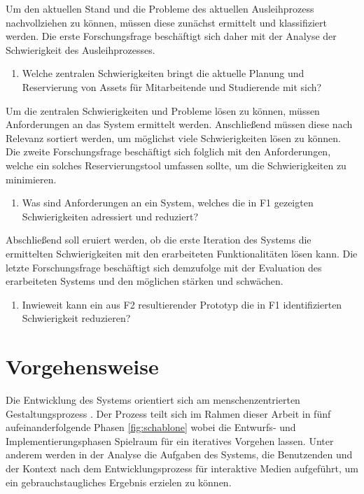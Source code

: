 Um den aktuellen Stand und die Probleme des aktuellen Ausleihprozess nachvollziehen zu können,
müssen diese zunächst ermittelt und klassifiziert werden. Die erste Forschungsfrage beschäftigt sich
daher mit der Analyse der Schwierigkeit des Ausleihprozesses.
\begin{enumerate}
  \item[\sffamily\color{maincolor} {F1 |}] {Welche zentralen Schwierigkeiten bringt die aktuelle Planung und Reservierung von Assets für Mitarbeitende und Studierende mit sich?}
\end{enumerate}

Um die zentralen Schwierigkeiten und Probleme lösen zu können, müssen Anforderungen an das System
ermittelt werden. Anschließend müssen diese nach Relevanz sortiert werden, um möglichst viele
Schwierigkeiten lösen zu können. Die zweite Forschungsfrage beschäftigt sich folglich mit den
Anforderungen, welche ein solches Reservierungstool umfassen sollte, um die Schwierigkeiten zu minimieren.

\begin{enumerate}
  \item[\sffamily\color{maincolor} {F2 |}] {Was sind Anforderungen an ein System, welches die in F1 gezeigten Schwierigkeiten adressiert und reduziert?}
\end{enumerate}

Abschließend soll eruiert werden, ob die erste Iteration des Systems die ermittelten Schwierigkeiten
mit den erarbeiteten Funktionalitäten lösen kann. Die letzte Forschungsfrage beschäftigt sich
demzufolge mit der Evaluation des erarbeiteten Systems und den möglichen stärken und schwächen.

\begin{enumerate}
  \item[\sffamily\color{maincolor} {F3 |}] {Inwieweit kann ein aus F2 resultierender Prototyp die in F1 identifizierten Schwierigkeit reduzieren?}
\end{enumerate}

\section{Vorgehensweise}
Die Entwicklung des Systems orientiert sich am menschenzentrierten Gestaltungsprozess
\cite{din_en_iso_9421-2102020-03_din_nodate}. Der Prozess teilt sich im Rahmen dieser Arbeit in
fünf aufeinanderfolgende Phasen {\ref{fig:schablone}} wobei die Entwurfs- und Implementierungsphasen
Spielraum für ein iteratives Vorgehen lassen. Unter anderem werden in der Analyse die Aufgaben des
Systems, die Benutzenden und der Kontext nach dem Entwicklungsprozess für interaktive Medien
\cite{herczeg_einfuhrung_2009} aufgeführt, um ein gebrauchstaugliches Ergebnis erzielen zu können.

